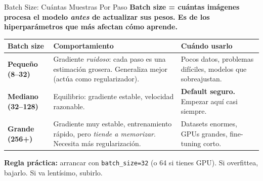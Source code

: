 \documentclass[aspectratio=169, 11pt]{beamer}
\begin{document}
\begin{frame}[shrink]{Batch Size: Cu\'antas Muestras Por Paso}
  \vspace{6pt}
  {\footnotesize\color{arcaDark}\bfseries
    \textbf{Batch size} = cu\'antas im\'agenes procesa el modelo
    \emph{antes} de actualizar sus pesos. Es de los hiperpar\'ametros
    que m\'as afectan c\'omo aprende.}

  \vspace{12pt}
  {\footnotesize
  \begin{tabular}{@{}p{2.4cm} p{4.5cm} p{5.0cm}@{}}
    \toprule
    \textbf{Batch size} & \textbf{Comportamiento} & \textbf{Cu\'ando usarlo} \\
    \midrule
    \rowcolor{arcaGray}
    \textbf{Peque\~no (8--32)}
    & Gradiente \emph{ruidoso}: cada paso es una estimaci\'on grosera.
      Generaliza mejor (act\'ua como regularizador).
    & Pocos datos, problemas dif\'iciles, modelos que sobreajustan. \\
    \textbf{Mediano (32--128)}
    & Equilibrio: gradiente estable, velocidad razonable.
    & \textbf{Default seguro.} Empezar aqu\'i casi siempre. \\
    \rowcolor{arcaGray}
    \textbf{Grande (256+)}
    & Gradiente muy estable, entrenamiento r\'apido,
      pero \emph{tiende a memorizar}. Necesita m\'as regularizaci\'on.
    & Datasets enormes, GPUs grandes, fine-tuning corto. \\
    \bottomrule
  \end{tabular}
  }

  \vspace{10pt}
  \begin{tcolorbox}[colback=codeGreen!8, colframe=codeGreen, boxrule=0.5pt,
    arc=2pt, left=6pt, right=6pt, top=4pt, bottom=4pt]
    {\scriptsize\color{arcaDark}
    \faKey\hspace{4pt}\textbf{Regla pr\'actica:} arrancar con
    \texttt{batch\_size=32} (o 64 si tienes GPU). Si overfittea,
    bajarlo. Si va lent\'isimo, subirlo.}
  \end{tcolorbox}
\end{frame}
\end{document}
